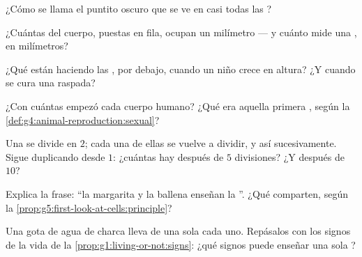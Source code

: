 \begin{exercise}[$\star$]\label{exo:g5:first-look-at-cells:4}
¿Cómo se llama el puntito oscuro que se ve en casi todas las ?
\end{exercise}

\begin{exercise}[$\star$]\label{exo:g5:first-look-at-cells:5}
¿Cuántas  del cuerpo, puestas en fila, ocupan un milímetro ---
y cuánto mide una , en milímetros?
\end{exercise}

\begin{exercise}[$\star$]\label{exo:g5:first-look-at-cells:6}
¿Qué están haciendo las , por debajo, cuando un niño crece en
altura? ¿Y cuando se cura una  raspada?
\end{exercise}

\begin{exercise}[$\star$]\label{exo:g5:first-look-at-cells:7}
¿Con cuántas  empezó cada cuerpo humano? ¿Qué era aquella
primera , según la \cref{def:g4:animal-reproduction:sexual}?
\end{exercise}

\begin{exercise}[$\star$]\label{exo:g5:first-look-at-cells:8}
Una  se divide en $2$; cada una de ellas se vuelve a dividir, y
así sucesivamente. Sigue duplicando desde $1$: ¿cuántas  hay
después de $5$ divisiones? ¿Y después de $10$?
\end{exercise}

\begin{exercise}[$\star\star$]\label{exo:g5:first-look-at-cells:9}
Explica la frase: ``la margarita y la ballena enseñan la ''. ¿Qué comparten, según la
\cref{prop:g5:first-look-at-cells:principle}?
\end{exercise}

\begin{exercise}[$\star\star$]\label{exo:g5:first-look-at-cells:10}
Una gota de agua de charca lleva  de una sola  cada
uno. Repásalos con los signos de la vida de la
\cref{prop:g1:living-or-not:signs}: ¿qué signos puede enseñar una sola
?
\end{exercise}

